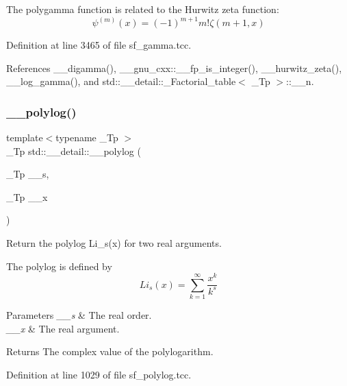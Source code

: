 The polygamma function is related to the Hurwitz zeta function\+: \[ \psi^{(m)}(x) = (-1)^{m+1} m! \zeta(m+1,x) \] 

Definition at line 3465 of file sf\+\_\+gamma.\+tcc.



References \+\_\+\+\_\+digamma(), \+\_\+\+\_\+gnu\+\_\+cxx\+::\+\_\+\+\_\+fp\+\_\+is\+\_\+integer(), \+\_\+\+\_\+hurwitz\+\_\+zeta(), \+\_\+\+\_\+log\+\_\+gamma(), and std\+::\+\_\+\+\_\+detail\+::\+\_\+\+Factorial\+\_\+table$<$ \+\_\+\+Tp $>$\+::\+\_\+\+\_\+n.

\mbox{\label{namespacestd_1_1____detail_a17fb8cea11706f319aaea277188a29c8}} 
\subsubsection{\texorpdfstring{\+\_\+\+\_\+polylog()}{\_\_polylog()}\hspace{0.1cm}{\footnotesize\ttfamily [1/2]}}
{\footnotesize\ttfamily template$<$typename \+\_\+\+Tp $>$ \\
\+\_\+\+Tp std\+::\+\_\+\+\_\+detail\+::\+\_\+\+\_\+polylog (\begin{DoxyParamCaption}\item[{\+\_\+\+Tp}]{\+\_\+\+\_\+s,  }\item[{\+\_\+\+Tp}]{\+\_\+\+\_\+x }\end{DoxyParamCaption})}

Return the polylog Li\+\_\+s(x) for two real arguments.

The polylog is defined by \[ Li_s(x) = \sum_{k=1}^{\infty} \frac{x^k}{k^s} \]


\begin{DoxyParams}{Parameters}
{\em \+\_\+\+\_\+s} & The real order. \\
\hline
{\em \+\_\+\+\_\+x} & The real argument. \\
\hline
\end{DoxyParams}
\begin{DoxyReturn}{Returns}
The complex value of the polylogarithm. 
\end{DoxyReturn}


Definition at line 1029 of file sf\+\_\+polylog.\+tcc.



